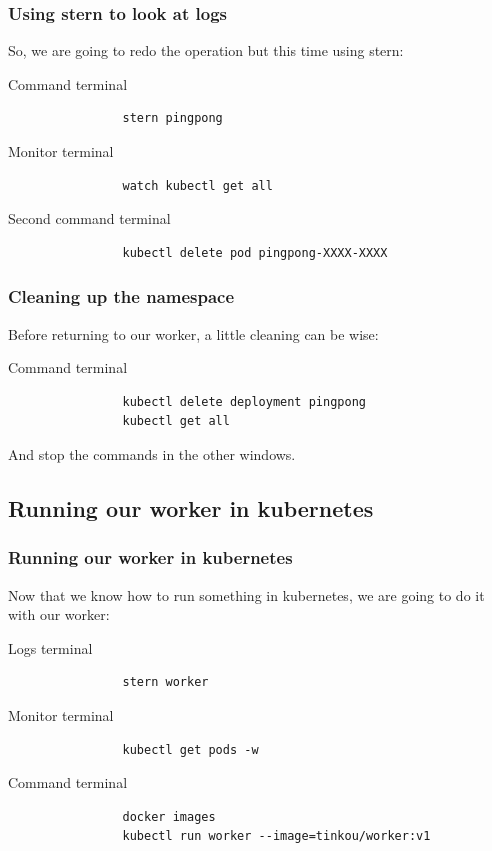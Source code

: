 	\begin{frame}[fragile]
		\frametitle{Using stern to look at logs}

		So, we are going to redo the operation but this time using stern:
		\begin{block}{Command terminal}
			\begin{verbatim}
				stern pingpong
			\end{verbatim}
		\end{block}
				\begin{block}{Monitor terminal}
			\begin{verbatim}
				watch kubectl get all
			\end{verbatim}
		\end{block}
		\begin{block}{Second command terminal}
			\begin{verbatim}
				kubectl delete pod pingpong-XXXX-XXXX
			\end{verbatim}
		\end{block}
	\end{frame}
	
	\begin{frame}[fragile]
		\frametitle{Cleaning up the namespace}
		
		Before returning to our worker, a little cleaning can be wise:
		\begin{block}{Command terminal}
			\begin{verbatim}
				kubectl delete deployment pingpong
				kubectl get all
			\end{verbatim}
		\end{block}
		
		\medskip
		
		And stop the commands in the other windows.
	\end{frame}
	
\subsection{Running our worker in kubernetes}

	\begin{frame}[fragile]
		\frametitle{Running our worker in kubernetes}
		
		Now that we know how to run something in kubernetes, we are going to do it with our worker:
		\begin{block}{Logs terminal}
			\begin{verbatim}
				stern worker
			\end{verbatim}
		\end{block}		
		\begin{block}{Monitor terminal}
			\begin{verbatim}
				kubectl get pods -w
			\end{verbatim}
		\end{block}
		\begin{block}{Command terminal}
			\begin{verbatim}
				docker images
				kubectl run worker --image=tinkou/worker:v1
			\end{verbatim}
		\end{block}
	\end{frame}
	
